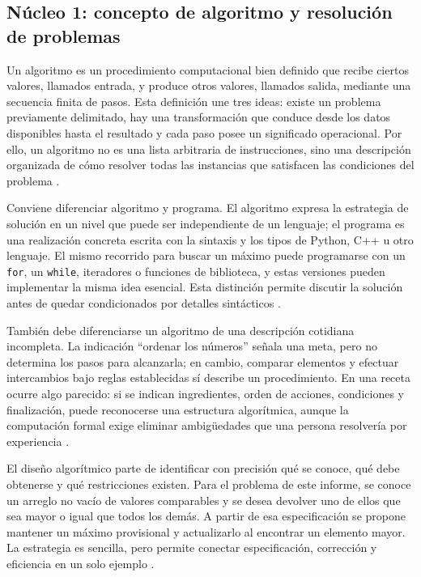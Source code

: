 \documentclass[12pt,letterpaper]{article}
\newcommand{\codigo}[1]{\texttt{#1}}
\begin{document}
\subsection{Núcleo 1: concepto de algoritmo y resolución de problemas}

Un algoritmo es un procedimiento computacional bien definido que recibe ciertos valores, llamados entrada, y produce otros valores, llamados salida, mediante una secuencia finita de pasos. Esta definición une tres ideas: existe un problema previamente delimitado, hay una transformación que conduce desde los datos disponibles hasta el resultado y cada paso posee un significado operacional. Por ello, un algoritmo no es una lista arbitraria de instrucciones, sino una descripción organizada de cómo resolver todas las instancias que satisfacen las condiciones del problema \citep{zanabria2026,cormen2022,knuth1997}.

Conviene diferenciar algoritmo y programa. El algoritmo expresa la estrategia de solución en un nivel que puede ser independiente de un lenguaje; el programa es una realización concreta escrita con la sintaxis y los tipos de Python, C++ u otro lenguaje. El mismo recorrido para buscar un máximo puede programarse con un \codigo{for}, un \codigo{while}, iteradores o funciones de biblioteca, y estas versiones pueden implementar la misma idea esencial. Esta distinción permite discutir la solución antes de quedar condicionados por detalles sintácticos \citep{cormen2022,sedgewick2011,skiena2020}.

También debe diferenciarse un algoritmo de una descripción cotidiana incompleta. La indicación ``ordenar los números'' señala una meta, pero no determina los pasos para alcanzarla; en cambio, comparar elementos y efectuar intercambios bajo reglas establecidas sí describe un procedimiento. En una receta ocurre algo parecido: si se indican ingredientes, orden de acciones, condiciones y finalización, puede reconocerse una estructura algorítmica, aunque la computación formal exige eliminar ambigüedades que una persona resolvería por experiencia \citep{zanabria2026,cormen2022,goodrichpy2013}.

El diseño algorítmico parte de identificar con precisión qué se conoce, qué debe obtenerse y qué restricciones existen. Para el problema de este informe, se conoce un arreglo no vacío de valores comparables y se desea devolver uno de ellos que sea mayor o igual que todos los demás. A partir de esa especificación se propone mantener un máximo provisional y actualizarlo al encontrar un elemento mayor. La estrategia es sencilla, pero permite conectar especificación, corrección y eficiencia en un solo ejemplo \citep{cormen2022,goodrichcpp2011,skiena2020}.
\end{document}
